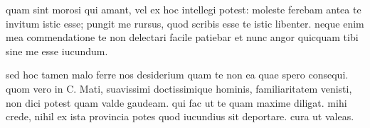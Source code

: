 


 quam sint morosi qui amant, vel ex hoc intellegi potest: moleste ferebam antea te invitum istic esse; pungit me rursus, quod scribis esse te istic libenter. neque enim mea commendatione te non delectari facile patiebar et nunc angor quicquam tibi sine me esse iucundum.

 sed hoc tamen malo ferre nos desiderium quam te non ea quae spero consequi. quom vero in C. Mati, suavissimi doctissimique hominis, familiaritatem venisti, non dici potest quam valde gaudeam. qui fac ut te quam maxime diligat. mihi crede, nihil ex ista provincia potes quod iucundius sit deportare. cura ut valeas.
